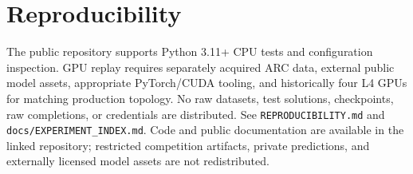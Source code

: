 \documentclass[10pt]{article}
\begin{document}
\section{Reproducibility}
The public repository supports Python 3.11+ CPU tests and configuration inspection. GPU replay requires separately acquired ARC data, external public model assets, appropriate PyTorch/CUDA tooling, and historically four L4 GPUs for matching production topology. No raw datasets, test solutions, checkpoints, raw completions, or credentials are distributed. See \texttt{REPRODUCIBILITY.md} and \texttt{docs/EXPERIMENT\_INDEX.md}. Code and public documentation are available in the linked repository; restricted competition artifacts, private predictions, and externally licensed model assets are not redistributed.

{\footnotesize


}
\end{document}
